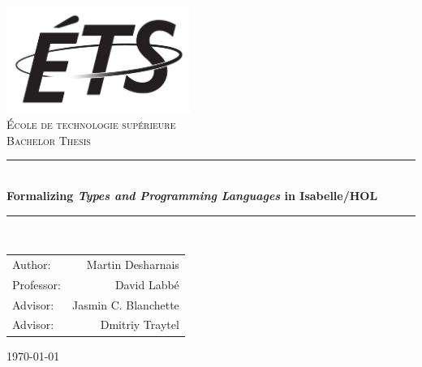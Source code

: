 \documentclass[12pt,a4paper,titlepage,oneside]{article}
\newcommand{\HRule}{\rule{\linewidth}{0.5mm}}
\begin{document}

\begin{titlepage}
  \begin{center}
    \includegraphics[width=6cm]{./logo-ETS.png}~\\[1cm]

    \textsc{\LARGE École de technologie supérieure}\\[1.5cm]
    \textsc{\Large Bachelor Thesis}\\[0.5cm]

    \HRule \\[0.4cm]
    { \huge \bfseries Formalizing \emph{Types and Programming Languages} in Isabelle/HOL \\[0.4cm] }

    \HRule \\[1.5cm]

    \begin{center}
      \begin{tabular}{lr}
        Author:    & Martin Desharnais \\
        Professor: & David Labbé \\
        Advisor:   & Jasmin C. Blanchette \\
        Advisor:   & Dmitriy Traytel
      \end{tabular}
    \end{center}

    \vfill

    {\large \today}

  \end{center}
\end{titlepage}

\newpage
{}
\end{document}
